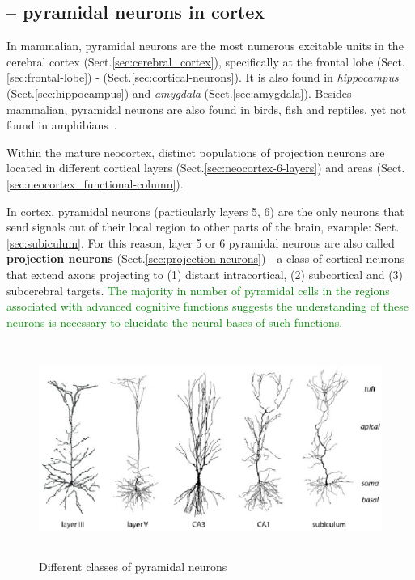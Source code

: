 \subsection{-- pyramidal neurons in cortex}
\label{sec:pyramidal-neuron-neocortex}

In mammalian, pyramidal neurons are the most numerous excitable units in the
cerebral cortex (Sect.\ref{sec:cerebral_cortex}), specifically at the frontal
lobe (Sect.\ref{sec:frontal-lobe}) - (Sect.\ref{sec:cortical-neurons}). It is
also found in {\it hippocampus} (Sect.\ref{sec:hippocampus}) and {\it amygdala}
(Sect.\ref{sec:amygdala}).
Besides mammalian, pyramidal neurons are also found in birds, fish and reptiles,
yet not found in amphibians~\cite{nieuwenhuys1994}.

Within the mature neocortex, distinct populations of projection neurons are
located in different cortical layers (Sect.\ref{sec:neocortex-6-layers}) and
areas (Sect.\ref{sec:neocortex_functional-column}).

In cortex, pyramidal neurons (particularly layers 5, 6) are the only neurons
that send signals out of their local region to other parts of the brain,
example: Sect.\ref{sec:subiculum}. For this reason, layer 5 or 6 pyramidal
neurons are also called {\bf projection neurons}
(Sect.\ref{sec:projection-neurons}) - a class of cortical neurons
that extend axons projecting to (1) distant
intracortical, (2) subcortical and (3) subcerebral targets.
\textcolor{green}{The majority in number of pyramidal cells in the
  regions associated with advanced cognitive functions suggests the
  understanding of these neurons is necessary to elucidate the neural
  bases of such functions.}

  

\begin{figure}[hbt]
  \centerline{\includegraphics[height=7cm,
    angle=0]{./images/pyramidal_classes.eps}}
\caption{Different classes of pyramidal neurons}
\label{fig:pyrmidal_class}
\end{figure}

